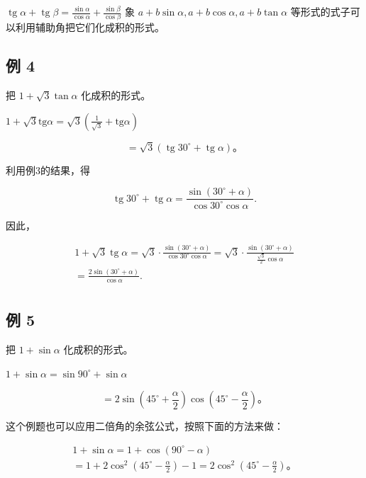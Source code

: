 \(\operatorname{tg} \alpha + \operatorname{tg} \beta = \frac{\sin \alpha}{\cos \alpha} + \frac{\sin \beta}{\cos \beta}\)
象 \(a + b\sin \alpha, a + b\cos \alpha, a + b\tan \alpha\)
等形式的式子可以利用辅助角把它们化成积的形式。

\subsection{例 4}

把 \(1+\sqrt{3}\tan\alpha\) 化成积的形式。

\(1 + \sqrt{3}\mathrm{tg}\alpha = \sqrt{3}\left(\frac{1}{\sqrt{3}} +\mathrm{tg}\alpha\right)\)

\[
= \sqrt {3} (\operatorname{tg} 30 ^{\circ} + \operatorname{tg} \alpha)\text{。}
\]

利用例3的结果，得

\[
\operatorname{tg} 30 ^{\circ} + \operatorname{tg} \alpha = \frac {\sin (30 ^{\circ} + \alpha)}{\cos 30 ^{\circ} \cos \alpha}.
\]

因此，

\[
\begin{array}{l} 1 + \sqrt {3} \operatorname{tg} \alpha = \sqrt {3} \cdot \frac {\sin (30 ^{\circ} + \alpha)}{\cos 30 ^{\circ} \cos \alpha} = \sqrt {3} \cdot \frac {\sin (30 ^{\circ} + \alpha)}{\frac {\sqrt {3}}{2} \cos \alpha} \\ = \frac {2 \sin (30 ^{\circ} + \alpha)}{\cos \alpha}. \\ \end{array}
\]

\subsection{例 5}

把 \(1 + \sin \alpha\) 化成积的形式。

 \(1 + \sin \alpha = \sin 90^{\circ} + \sin \alpha\)

\[
= 2 \sin \left(45 ^{\circ} + \frac {\alpha}{2}\right) \cos \left(45 ^{\circ} - \frac {\alpha}{2}\right)\text{。}
\]

这个例题也可以应用二倍角的余弦公式，按照下面的方法来做：

\[
\begin{array}{l} 1 + \sin \alpha = 1 + \cos (90 ^{\circ} - \alpha) \\ = 1 + 2 \cos^ {2} \left(45 ^{\circ} - \frac {\alpha}{2}\right) - 1 = 2 \cos^ {2} \left(45 ^{\circ} - \frac {\alpha}{2}\right)\text{。} \\ \end{array}
\]

